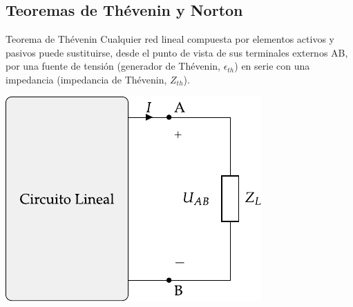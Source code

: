 \documentclass[aspectratio=169, usenames,svgnames,dvipsnames]{beamer}
\begin{document}

\subsection{Teoremas de Thévenin y Norton}

\begin{frame}{Teorema de Thévenin}
    \vspace{3mm}
    Cualquier \alert{red lineal} compuesta por elementos activos y pasivos puede sustituirse, desde el punto de vista de sus terminales externos AB, por una \alert{fuente de tensión} (generador de Thévenin, \(\epsilon_{th}\)) en \alert{serie} con una impedancia (impedancia de Thévenin, \(Z_{th}\)).

    \vspace{2mm}
    \begin{center}
        \includegraphics[height=0.6\textheight]{../figs/EquivalenteThevenin.pdf}
    \end{center}
\end{frame}

\end{document}

